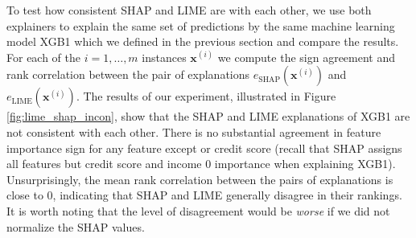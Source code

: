 \documentclass[mnsc,blindrev]{informs3}
\begin{document}
                    To test how consistent SHAP and LIME are with each other, we use both explainers to explain the same set of predictions by the same machine learning model XGB1 which we defined in the previous section and compare the results. For each of the $i=1,\ldots,m$ instances $\mathbf{x}^{(i)}$ we compute the sign agreement and rank correlation between the pair of explanations $e_\text{SHAP}(\mathbf{x}^{(i)})$ and $e_\text{LIME}(\mathbf{x}^{(i)})$. The results of our experiment, illustrated in Figure \ref{fig:lime_shap_incon}, show that the SHAP and LIME explanations of XGB1 are not consistent with each other. There is no substantial agreement in feature importance sign for any feature except or credit score (recall that SHAP assigns all features but credit score and income 0 importance when explaining XGB1). Unsurprisingly, the mean rank correlation between the pairs of explanations is close to 0, indicating that SHAP and LIME generally disagree in their rankings. It is worth noting that the level of disagreement would be \emph{worse} if we did not normalize the SHAP values. 
                    
                
                    
    
\end{document}
